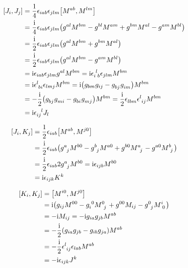 \begin{align}
    \comm{J_i}{J_j}&=\frac14\epsilon_{iab}\epsilon_{jlm}\comm{M^{ab}}{M^{lm}}\nonumber\\
    &=\frac\im 4\epsilon_{iab}\epsilon_{jlm}\qty(g^{al}M^{bm}-g^{bl}M^{am}+g^{bm}M^{al}-g^{am}M^{bl})\nonumber\\
    &=\frac\im 2\epsilon_{iab}\epsilon_{jlm}\qty(g^{al}M^{bm}+g^{bm}M^{al})\nonumber\\
    &=\frac\im 2\epsilon_{iab}\epsilon_{jlm}\qty(g^{al}M^{bm}-g^{am}M^{bl})\nonumber\\
    &=\im\epsilon_{iab}\epsilon_{jlm}g^{al}M^{bm}=\im\tensor{\epsilon}{_i^l_b}\epsilon_{jlm}M^{bm}\nonumber\\
    &=\im\tensor{\epsilon}{^l_b_i}\epsilon_{lmj}M^{bm}=\im\qty(g_{bm}g_{ij}-\tensor{g}{_b_j}\tensor{g}{_i_m})M^{bm}\nonumber\\
    &=-\frac\im2\qty(\tensor{g}{_b_j}\tensor{g}{_m_i}-\tensor{g}{_b_i}\tensor{g}{_m_j})M^{bm}=\frac\im2\tensor{\epsilon}{_l_b_m}\tensor{\epsilon}{^l_i_j}M^{bm}\nonumber\\
    &=\im\tensor{\epsilon}{_i_j^l}J_l\nonumber
\end{align}

\begin{align}
    \comm{J_i}{K_j}&=\frac12\epsilon_{iab}\comm{M^{ab}}{M^{j0}}\nonumber\\
    &=\frac\im2\epsilon_{iab}\qty(\tensor{g}{^a_j}M^{b0}-\tensor{g}{^b_j}M^{a0}+g^{b0}\tensor{M}{^a_j}-g^{a0}\tensor{M}{^b_j})\nonumber\\
    &=\frac\im2\epsilon_{iab}2\tensor{g}{^a_j}M^{b0}=\im\epsilon_{ijb}M^{b0}\nonumber\\
    &=\im\epsilon_{ijk}K^k\nonumber
\end{align}

\begin{align}
    \comm{K_i}{K_j}&=\comm{M^{i0}}{M^{j0}}\nonumber\\
    &=\im\qty(g_{ij}M^{00}-\tensor{g}{_i^0}\tensor{M}{^0_j}+\tensor{g}{^0^0}M_{ij}-\tensor{g}{^0_j}\tensor{M}{^i_0})\nonumber\\
    &=-\im M_{ij}=-\im g_{ia}g_{jb}M^{ab}\nonumber\\
    &=-\frac\im2\qty(g_{ia}g_{jb}-g_{ib}g_{ja})M^{ab}\nonumber\\
    &=-\frac\im2\tensor{\epsilon}{^l_i_j}\epsilon_{lab}M^{ab}\nonumber\\
    &=-\im\epsilon_{ijk}J^{k}\nonumber
\end{align}

